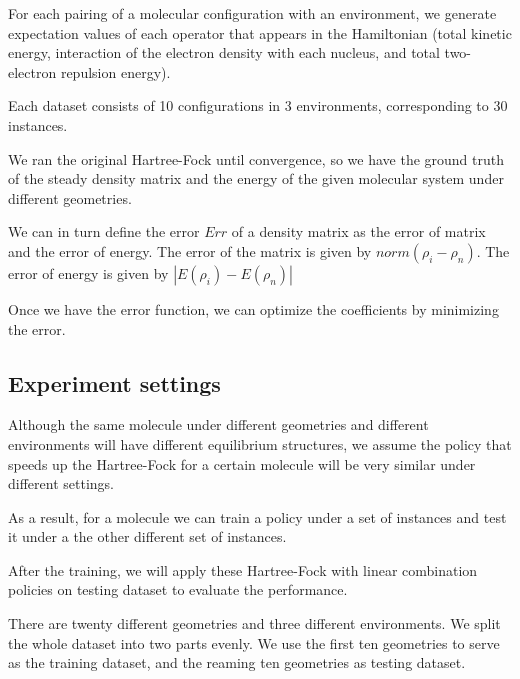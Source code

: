 \documentclass[twoside]{article}
\begin{document}
For each pairing of a molecular configuration with an environment, we generate expectation values of each operator that appears in the Hamiltonian (total kinetic energy, interaction of the electron density with each nucleus, and total two-electron repulsion energy).

Each dataset consists of 10 configurations in 3 environments, corresponding to 30 instances. %


We ran the original Hartree-Fock until convergence, so we have the ground truth of the steady density matrix and the energy of the given molecular system under different geometries. 

We can in turn define the error $Err$ of a density matrix as the error of matrix and the error of energy. The error of the matrix is given by $norm(\rho_i-\rho_n)$. The error of energy is given by $|E(\rho_i)-E(\rho_n)|$

Once we have the error function, we can optimize the coefficients by minimizing the error.


\subsection{Experiment settings}


Although the same molecule under different geometries and different environments will have different equilibrium structures, we assume the policy that speeds up the Hartree-Fock for a certain molecule will be very similar under different settings. 

As a result, for a molecule we can train a policy under a set of instances and test it under a the other different set of instances.

After the training, we will apply these Hartree-Fock with linear combination policies on testing dataset to evaluate the performance.


There are twenty different geometries and three different environments. We split the whole dataset into two parts evenly. 
We use the first ten geometries to serve as the training dataset, and the reaming ten geometries as testing dataset.
\end{document}
